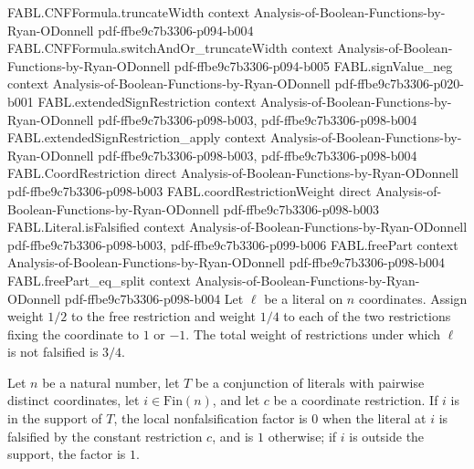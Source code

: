 \begin{theorem}
  {FABL.CNFFormula.truncateWidth}
  {context}
  {Analysis-of-Boolean-Functions-by-Ryan-ODonnell}
  {pdf-ffbe9c7b3306-p094-b004}
\proofstep
  {FABL.CNFFormula.switchAndOr_truncateWidth}
  {context}
  {Analysis-of-Boolean-Functions-by-Ryan-ODonnell}
  {pdf-ffbe9c7b3306-p094-b005}
\proofstep
  {FABL.signValue_neg}
  {context}
  {Analysis-of-Boolean-Functions-by-Ryan-ODonnell}
  {pdf-ffbe9c7b3306-p020-b001}
\proofstep
  {FABL.extendedSignRestriction}
  {context}
  {Analysis-of-Boolean-Functions-by-Ryan-ODonnell}
  {pdf-ffbe9c7b3306-p098-b003,
    pdf-ffbe9c7b3306-p098-b004}
\proofstep
  {FABL.extendedSignRestriction_apply}
  {context}
  {Analysis-of-Boolean-Functions-by-Ryan-ODonnell}
  {pdf-ffbe9c7b3306-p098-b003,
    pdf-ffbe9c7b3306-p098-b004}
\proofstep
  {FABL.CoordRestriction}
  {direct}
  {Analysis-of-Boolean-Functions-by-Ryan-ODonnell}
  {pdf-ffbe9c7b3306-p098-b003}
\proofstep
  {FABL.coordRestrictionWeight}
  {direct}
  {Analysis-of-Boolean-Functions-by-Ryan-ODonnell}
  {pdf-ffbe9c7b3306-p098-b003}
\proofstep
  {FABL.Literal.isFalsified}
  {context}
  {Analysis-of-Boolean-Functions-by-Ryan-ODonnell}
  {pdf-ffbe9c7b3306-p098-b003,
    pdf-ffbe9c7b3306-p099-b006}
\proofstep
  {FABL.freePart}
  {context}
  {Analysis-of-Boolean-Functions-by-Ryan-ODonnell}
  {pdf-ffbe9c7b3306-p098-b004}
\proofstep
  {FABL.freePart_eq_split}
  {context}
  {Analysis-of-Boolean-Functions-by-Ryan-ODonnell}
  {pdf-ffbe9c7b3306-p098-b004}
Let $\ell$ be a literal on $n$ coordinates. Assign weight $1/2$ to the free restriction
and weight $1/4$ to each of the two restrictions fixing the coordinate to $1$ or $-1$.
The total weight of restrictions under which $\ell$ is not falsified is $3/4$.
\end{theorem}

\begin{definition}
\label{FABL.DNFTerm.localNotFalsifiedFactor}
\leanok
{}
Let $n$ be a natural number, let $T$ be a conjunction of literals with pairwise distinct
coordinates, let $i\in\mathrm{Fin}(n)$, and let $c$ be a coordinate restriction. If
$i$ is in the support of $T$, the local nonfalsification factor is $0$ when the literal
at $i$ is falsified by the constant restriction $c$, and is $1$ otherwise; if $i$ is
outside the support, the factor is $1$.
\end{definition}

